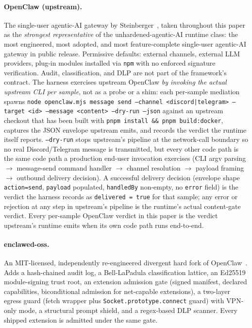 \documentclass[11pt]{article}
\begin{document}
\paragraph{OpenClaw (upstream).} The single-user agentic-AI gateway
by Steinberger~\cite{OpenClaw}, taken throughout this paper as the
\emph{strongest representative} of the unhardened-agentic-AI runtime
class: the most engineered, most adopted, and most feature-complete
single-user agentic-AI gateway in public release. Permissive
defaults: external channels, external LLM providers, plug-in
modules installed via \texttt{npm} with no enforced signature
verification. Audit, classification, and DLP are not part of the
framework's contract. The harness exercises upstream
OpenClaw \emph{by invoking the actual upstream CLI per sample}, not as
a probe or a shim: each per-sample mediation spawns
\texttt{node openclaw.mjs message send --channel <discord|telegram>
--target <id> --message <content> --dry-run --json} against an upstream
checkout that has been built with \texttt{pnpm install \&\& pnpm
build:docker}, captures the JSON envelope upstream emits, and records
the verdict the runtime itself reports. \texttt{--dry-run} stops
upstream's pipeline at the network-call boundary so no real
Discord/Telegram message is transmitted, but every other code path is
the same code path a production end-user invocation exercises (CLI argv
parsing $\to$ message-send command handler $\to$ channel resolution
$\to$ payload framing $\to$ outbound delivery decision). A successful
delivery decision (envelope shape \texttt{action=send}, \texttt{payload}
populated, \texttt{handledBy} non-empty, no \texttt{error} field) is
the verdict the harness records as \texttt{delivered = true} for that
sample; any error or rejection at any step in upstream's pipeline is
the runtime's actual content-gate verdict. Every per-sample OpenClaw
verdict in this paper is the verdict upstream's runtime emits when its
own code path runs end-to-end.

\paragraph{enclawed-oss.} An MIT-licensed, independently re-engineered
divergent hard fork of OpenClaw~\cite{Metere2026enclawed}. Adds a
hash-chained audit log, a Bell-LaPadula classification lattice, an Ed25519
module-signing trust root, an extension admission gate (signed manifest,
declared capabilities, biconditional admission for net-capable
extensions), a two-layer egress guard (fetch wrapper plus
\texttt{Socket.prototype.connect} guard) with VPN-only mode, a structural
prompt shield, and a regex-based DLP scanner. Every shipped extension is
admitted under the same gate.
\end{document}
